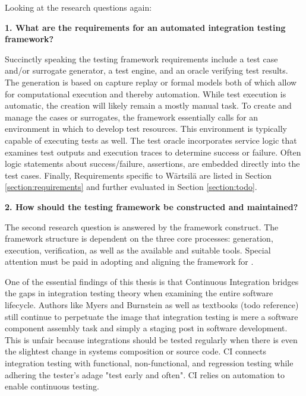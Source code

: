 \documentclass[12pt,a4paper,oneside,pdftex]{report}
\begin{document}
{Looking at the research questions again:

\begin{adjustwidth}{2.5em}{0pt}
\textbf{1. What are the requirements for an automated integration testing framework?} \\
\end{adjustwidth}

Succinctly speaking the testing framework requirements include a test case and/or surrogate generator, a test engine, and an oracle verifying test results. The generation is based on capture replay or formal models both of which allow for computational execution and thereby automation. While test execution is automatic, the creation will likely remain a mostly manual task. To create and manage the cases or surrogates, the framework essentially calls for an environment in which to develop test resources. This environment is typically capable of executing tests as well. The test oracle incorporates service logic that examines test outputs and execution traces to determine success or failure. Often logic statements about success/failure, assertions, are embedded directly into the test cases. Finally, Requirements specific to Wärtsilä are listed in Section \ref{section:requirements} and further evaluated in Section \ref{section:todo}. 

\begin{adjustwidth}{2.5em}{0pt}
\textbf{2. How should the testing framework be constructed and maintained?} \\
\end{adjustwidth}

The second research question is answered by the framework construct. The framework structure is dependent on the three core processes: generation, execution, verification, as well as the available and suitable tools. Special attention must be paid in adopting and aligning the framework for .

One of the essential findings of this thesis is that Continuous Integration bridges the gaps in integration testing theory when examining the entire software lifecycle. Authors like Myers and Burnstein as well as textbooks (todo reference) still continue to perpetuate the image that integration testing is mere a software component assembly task and simply a staging post in software development. This is unfair because integrations should be tested regularly when there is even the slightest change in systems composition or source code. CI connects integration testing with functional, non-functional, and regression testing while adhering the tester's adage "test early and often". CI relies on automation to enable continuous testing.

}
\end{document}
